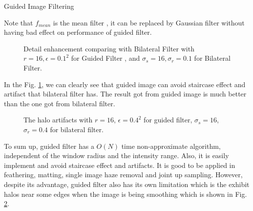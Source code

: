 \begin{algorithm}[htp]
	\caption {Guided Image Filtering}
	
	\label{alg:gif}
	\SetVline
	\linesnumbered
\end{algorithm}

Note that $f_{mean}$ is the mean filter \cite{Gonzalez06DIP}, it can be replaced by Gaussian filter without having bad effect on performance of guided filter. 

\begin{figure}[ht]
	\caption{Detail enhancement comparing with Bilateral Filter with $r = 16, \epsilon = 0.1^{2}$ for Guided Filter , and $\sigma_{s} = 16, \sigma_{r} = 0.1$ for Bilateral Filter. \cite{He2013} }
	\label{fig:guide_filter_result}
\end{figure}

In the Fig. \ref{fig:guide_filter_result}, we can clearly see that guided image can avoid staircase effect and artifact that bilateral filter has. The result got from guided image is much better than the one got from bilateral filter.

\begin{figure}[ht]
	\caption{The halo artifacts with $r = 16$, $\epsilon=0.4^{2}$ for  guided filter, $\sigma_{s}=16$, $\sigma_{r}= 0.4$ for bilateral filter.\cite{He2013} }
	\label{fig:guide_filter_result1}
\end{figure}
To sum up, guided filter has a $O(N)$ time non-approximate algorithm, independent of the window radius and the intensity range. Also, it is easily implement and avoid staircase effect and artifacts. It is good to be applied in feathering, matting, single image haze removal and joint up sampling. However, despite its advantage, guided filter also has its own limitation which is the exhibit halos near some edges when the image is being smoothing which is shown in Fig. \ref{fig:guide_filter_result1}.

